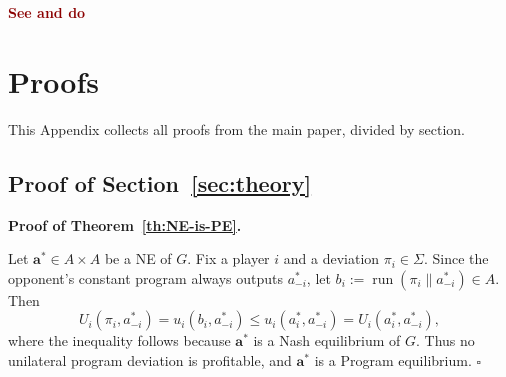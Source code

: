 \documentclass[twoside,11pt]{article}
\renewcommand{\BlackBox}{\ensuremath{\square}}
\renewenvironment{proof}[1][Proof]{%
  \par\noindent\textbf{#1.}\enspace\ignorespaces
}{%
  \ifhmode\unskip\nobreak\hfill\quad\else\noindent\hfill\fi
  \BlackBox\par\addvspace{2mm}%
}
\newcommand{\boldred}[1]{\textbf{\textcolor{darkred}{#1}}}
\begin{document}

 \boldred{See and do}




\appendix
{}












\section{Proofs}\label{sec:app:proof}

This Appendix collects all proofs from the main paper, divided by section.

\subsection{Proof of Section~\ref{sec:theory}}

\begin{proof}[Proof of Theorem~\ref{th:NE-is-PE}]
Let $\bm{a}^* \in A \times A$ be a NE of $G$. Fix a player $i$ and a deviation $\pi_i\in\Sigma$. Since the opponent's constant program always outputs $a_{-i}^*$, let $b_i:=\operatorname{run}(\pi_i\parallel a_{-i}^*)\in A$. Then
\[
U_i(\pi_i,a_{-i}^*)
= u_i(b_i,a_{-i}^*)
\le u_i(a_i^*,a_{-i}^*)
= U_i(a_i^*,a_{-i}^*),
\]
where the inequality follows because $\bm{a}^*$ is a Nash equilibrium of $G$. Thus no unilateral program deviation is profitable, and $\bm{a}^*$ is a Program equilibrium.
\end{proof}
\end{document}
